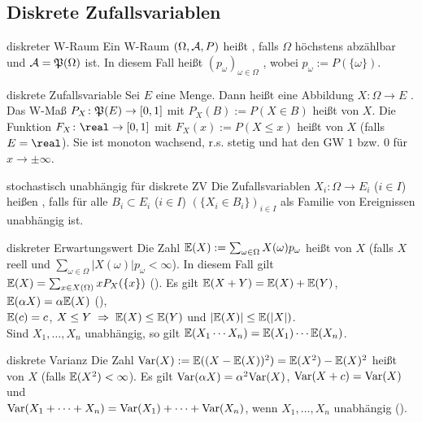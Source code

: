 \subsection{%
    Diskrete Zufallsvariablen%
}

\begin{Def}{diskreter W-Raum}
    Ein W-Raum $(\Omega, \mathcal{A}, P)$ heißt , falls $\Omega$ höchstens abzählbar und
    $\mathcal{A} = \mathfrak{P}(\Omega)$ ist.
    In diesem Fall heißt
    $(p_\omega)_{\omega \in \Omega}$ , wobei $p_\omega := P(\{\omega\})$.
\end{Def}

\begin{Def}{diskrete Zufallsvariable}
    Sei $E$ eine Menge.
    Dann heißt eine Abbildung $X\colon \Omega \rightarrow E$ .
    Das W-Maß $P_X\colon \mathfrak{P}(E) \rightarrow [0, 1]$ mit $P_X(B) := P(X \in B)$ heißt
     von $X$.
    Die Funktion $F_X\colon \real \rightarrow [0, 1]$ mit $F_X(x) := P(X \le x)$ heißt
     von $X$
    (falls $E = \real$).
    Sie ist monoton wachsend, r.s. stetig und
    hat den GW $1$ bzw. $0$ für $x \to \pm\infty$.
\end{Def}

\begin{Def}{stochastisch unabhängig für diskrete ZV}
    Die Zufallsvariablen $X_i\colon \Omega \rightarrow E_i$ ($i \in I$)
    heißen , falls für alle $B_i \subset E_i$ ($i \in I$)
    $(\{X_i \in B_i\})_{i \in I}$ als Familie von Ereignissen unabhängig ist.
\end{Def}

\begin{Def}{diskreter Erwartungswert}
    Die Zahl $\mathbb{E}(X) := \sum_{\omega \in \Omega} X(\omega) p_\omega$ heißt
     von $X$
    (falls $X$ reell und $\sum_{\omega \in \Omega} |X(\omega)| p_\omega < \infty$).
    In diesem Fall gilt $\mathbb{E}(X) = \sum_{x \in X(\Omega)} x P_X(\{x\})$
    ().
    Es gilt
    $\mathbb{E}(X + Y) = \mathbb{E}(X) + \mathbb{E}(Y)$, $\mathbb{E}(\alpha X) = \alpha \mathbb{E}(X)$ (),\\
    $\mathbb{E}(c) = c$,
    $X \le Y \;\Rightarrow\; \mathbb{E}(X) \le \mathbb{E}(Y)$ und
    $|\mathbb{E}(X)| \le \mathbb{E}(|X|)$.\\
    Sind $X_1, \dotsc, X_n$ unabhängig, so gilt $\mathbb{E}(X_1 \dotsm X_n) = \mathbb{E}(X_1) \dotsm \mathbb{E}(X_n)$.
\end{Def}

\begin{Def}{diskrete Varianz}
    Die Zahl $\mathrm{Var}(X) := \mathbb{E}((X - \mathbb{E}(X))^2) = \mathbb{E}(X^2) - \mathbb{E}(X)^2$ heißt 
    von $X$ (falls $\mathbb{E}(X^2) < \infty$).
    Es gilt $\mathrm{Var}(\alpha X) = \alpha^2 \mathrm{Var}(X)$, $\mathrm{Var}(X + c) = \mathrm{Var}(X)$ und\\
    $\mathrm{Var}(X_1 + \dotsb + X_n) = \mathrm{Var}(X_1) + \dotsb + \mathrm{Var}(X_n)$,
    wenn $X_1, \dotsc, X_n$ unabhängig ().
\end{Def}

